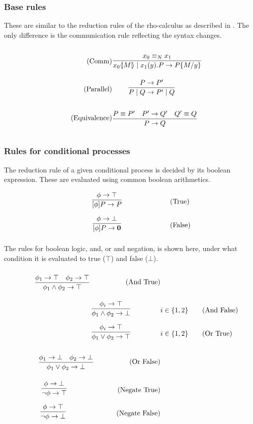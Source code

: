 \subsubsection{Base rules}
These are similar to the reduction rules of the rho-calculus as described in \citep{Meredith2005}. The only difference is the communication rule reflecting the syntax changes.

\begin{align}
	\tag{Comm} \infrule{x_0 \equiv_N x_1}{\lift{x_0}{M}\para\inp{x_1}{y}P\ra P\{M/y\}}&\\
	\tag{Parallel} \infrule{P\ra P'}{P\para Q\ra P'\para Q}&\\
	\tag{Equivalence} \infrule{P\equiv P'\quad P'\ra Q'\quad Q'\equiv Q}{P\ra Q}&
\end{align}

\FloatBarrier

\subsubsection{Rules for conditional processes}
The reduction rule of a given conditional process is decided by its boolean expression. These are evaluated using common boolean arithmetics.

\begin{align}
	& \infrule{\phi \ra \top}{[\phi]P\ra P} \tag{True}\\
	& \infrule{\phi \ra \bot}{[\phi]P\ra \nil} \tag{False}
\end{align}

The rules for boolean logic, and, or and negation, is shown here, under what condition it is evaluated to true (\ensuremath{\top}) and false (\ensuremath{\bot}).
\begin{align*}
\infrule{\phi_1 \ra \top \quad \phi_2 \ra \top}{\phi_1 \wedge \phi_2 \ra \top}\tag{And True}\\
\infrule{\phi_i \ra \top}{\phi_1 \wedge \phi_2 \ra \bot} &i\in \{1,2\}\tag{And False}\\
\infrule{\phi_i \ra \top}{\phi_1 \vee \phi_2 \ra \top} &i\in \{1,2\} \tag{Or True}\\
\infrule{\phi_1 \ra \bot \quad \phi_2 \ra \bot}{\phi_1 \vee \phi_2 \ra \bot} \tag{Or False}\\
\infrule{\phi \ra \bot}{\neg\phi \ra \top} \tag{Negate True}\\
\infrule{\phi \ra \top}{\neg\phi \ra \bot} \tag{Negate False}\\
\end{align*}

